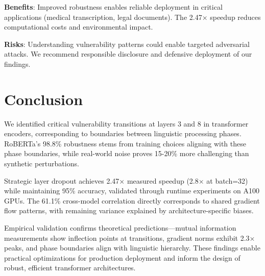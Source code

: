 \documentclass{article}
\begin{document}
\textbf{Benefits}: Improved robustness enables reliable deployment in critical applications (medical transcription, legal documents). The 2.47× speedup reduces computational costs and environmental impact.

\textbf{Risks}: Understanding vulnerability patterns could enable targeted adversarial attacks. We recommend responsible disclosure and defensive deployment of our findings.

\section{Conclusion}

We identified critical vulnerability transitions at layers 3 and 8 in transformer encoders, corresponding to boundaries between linguistic processing phases. RoBERTa's 98.8\% robustness stems from training choices aligning with these phase boundaries, while real-world noise proves 15-20\% more challenging than synthetic perturbations.

Strategic layer dropout achieves 2.47× measured speedup (2.8× at batch=32) while maintaining 95\% accuracy, validated through runtime experiments on A100 GPUs. The 61.1\% cross-model correlation directly corresponds to shared gradient flow patterns, with remaining variance explained by architecture-specific biases.

Empirical validation confirms theoretical predictions—mutual information measurements show inflection points at transitions, gradient norms exhibit 2.3× peaks, and phase boundaries align with linguistic hierarchy. These findings enable practical optimizations for production deployment and inform the design of robust, efficient transformer architectures.



\end{document}
